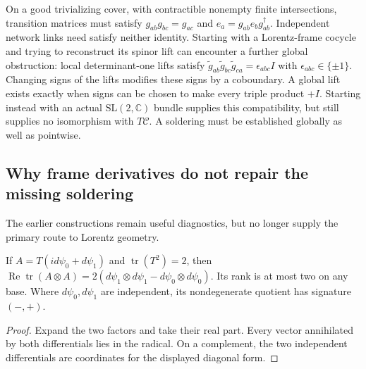 On a good trivializing cover, with contractible nonempty finite intersections, transition matrices must satisfy $g_{ab}g_{bc}=g_{ac}$ and $e_a=g_{ab}e_bg_{ab}^\dagger$. Independent network links need satisfy neither identity. Starting with a Lorentz-frame cocycle and trying to reconstruct its spinor lift can encounter a further global obstruction: local determinant-one lifts satisfy $\widetilde g_{ab}\widetilde g_{bc}\widetilde g_{ca}=\epsilon_{abc}I$ with $\epsilon_{abc}\in\{\pm1\}$. Changing signs of the lifts modifies these signs by a coboundary. A global lift exists exactly when signs can be chosen to make every triple product $+I$. Starting instead with an actual $\mathrm{SL}(2,\mathbb C)$ bundle supplies this compatibility, but still supplies no isomorphism with $T\mathcal C$. A soldering must be established globally as well as pointwise.

\subsection{Why frame derivatives do not repair the missing soldering}

The earlier constructions remain useful diagnostics, but no longer supply the primary route to Lorentz geometry.

\begin{proposition}
\label{prop:rank_obstruction}
If $A=T(id\psi_0+d\psi_1)$ and $\operatorname{tr}(T^2)=2$, then $\operatorname{Re}\operatorname{tr}(A\otimes A)=2(d\psi_1\otimes d\psi_1-d\psi_0\otimes d\psi_0)$. Its rank is at most two on any base. Where $d\psi_0,d\psi_1$ are independent, its nondegenerate quotient has signature $(-,+)$.
\end{proposition}
\begin{proof}
Expand the two factors and take their real part. Every vector annihilated by both differentials lies in the radical. On a complement, the two independent differentials are coordinates for the displayed diagonal form.
\end{proof}

